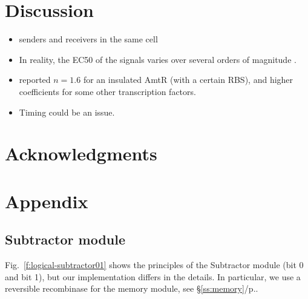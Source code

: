 \documentclass[12pt,notitlepage]{article}
\let\cite\citep
\begin{document}
%

\section{Discussion} \label{s:discussion}


\begin{itemize}
\item 
    senders and receivers in the same cell
\item
    In reality,
    the EC50 of the signals
    varies over several orders of magnitude
    \cite[SM:Fig.~8]{DuETAL2020}.
\item
    \citet[SM:p.10]{NielsenETAL2016}
    reported
    $n = 1.6$ for an insulated AmtR
    (with a certain RBS),
    and higher coefficients for
    some other transcription factors.
\item
    Timing could be an issue.
\end{itemize}


\section{Acknowledgments}




\clearpage

\footnotesize


\normalsize




\clearpage


\section*{Appendix}


\subsection{Subtractor module}

Fig.~\ref{f:logical-subtractor01} 
shows the principles of
the Subtractor module (bit 0 and bit 1),
but our implementation
differs in the details.
%
In particular, we use a reversible recombinase
for the memory module, see \S\ref{ss:memory}/p.\pageref{ss:memory}.
\end{document}
